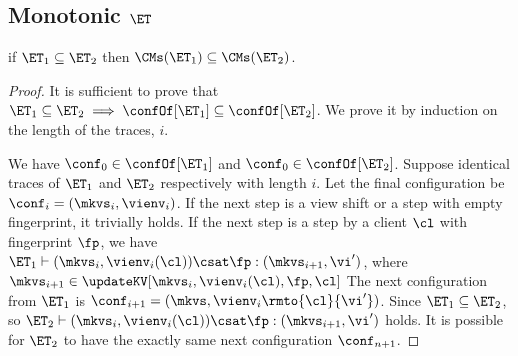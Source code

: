 \subsection{Monotonic \( \ET \)}
\label{sec:mono-et}
\begin{proposition}
\label{prop:mono-et}
if $\ET_1 \subseteq \ET_2$ then $\CMs(\ET_1) \subseteq \CMs(\ET_2)$.
\end{proposition}
\begin{proof}
It is sufficient to prove that \(\ET_1 \subseteq \ET_2 \implies \confOf[\ET_1] \subseteq \confOf[\ET_2] \).
We prove it by induction on the length of the traces, \( i \).

We have \( \conf_0 \in \confOf[\ET_1] \) and \( \conf_0 \in \confOf[\ET_2]\).
Suppose identical traces of \( \ET_1 \) and \( \ET_2 \) respectively with length \( i \).
Let the final configuration be \( \conf_i = ( \mkvs_i, \vienv_i ) \).
If the next step is a view shift or a step with empty fingerprint, it trivially holds.
If the next step is a step by a client \( \cl \) with fingerprint \( \fp \),
we have \( \ET_1 \vdash (\mkvs_i, \vienv_i(\cl)) \csat \fp : (\mkvs_{i+1}, \vi') \),
where \( \mkvs_{i+1} \in \updateKV[ \mkvs_i, \vienv_i(\cl), \fp, \cl] \)
The next configuration from \( \ET_1 \) is \( \conf_{i+1} =  (\mkvs, \vienv_i\rmto{\cl}{\vi'})\).
Since \( \ET_1 \subseteq \ET_2 \), so \( \ET_2 \vdash (\mkvs_i, \vienv_i(\cl)) \csat \fp : (\mkvs_{i+1}, \vi') \) holds.
It is possible for \( \ET_2 \) to have the exactly same next configuration \( \conf_{n+1}\).
\end{proof}
